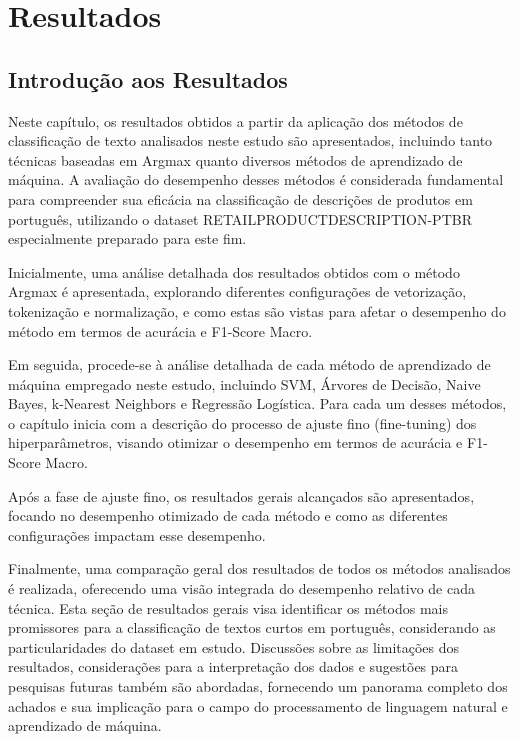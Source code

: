 \chapter{Resultados}

\section{Introdução aos Resultados}

Neste capítulo, os resultados obtidos a partir da aplicação dos métodos de classificação de texto analisados neste estudo são apresentados, incluindo tanto técnicas baseadas em Argmax quanto diversos métodos de aprendizado de máquina. A avaliação do desempenho desses métodos é considerada fundamental para compreender sua eficácia na classificação de descrições de produtos em português, utilizando o dataset RETAILPRODUCTDESCRIPTION-PTBR especialmente preparado para este fim.

Inicialmente, uma análise detalhada dos resultados obtidos com o método Argmax é apresentada, explorando diferentes configurações de vetorização, tokenização e normalização, e como estas são vistas para afetar o desempenho do método em termos de acurácia e F1-Score Macro.

Em seguida, procede-se à análise detalhada de cada método de aprendizado de máquina empregado neste estudo, incluindo SVM, Árvores de Decisão, Naive Bayes, k-Nearest Neighbors e Regressão Logística. Para cada um desses métodos, o capítulo inicia com a descrição do processo de ajuste fino (fine-tuning) dos hiperparâmetros, visando otimizar o desempenho em termos de acurácia e F1-Score Macro.

Após a fase de ajuste fino, os resultados gerais alcançados são apresentados, focando no desempenho otimizado de cada método e como as diferentes configurações impactam esse desempenho.

Finalmente, uma comparação geral dos resultados de todos os métodos analisados é realizada, oferecendo uma visão integrada do desempenho relativo de cada técnica. Esta seção de resultados gerais visa identificar os métodos mais promissores para a classificação de textos curtos em português, considerando as particularidades do dataset em estudo. Discussões sobre as limitações dos resultados, considerações para a interpretação dos dados e sugestões para pesquisas futuras também são abordadas, fornecendo um panorama completo dos achados e sua implicação para o campo do processamento de linguagem natural e aprendizado de máquina.

